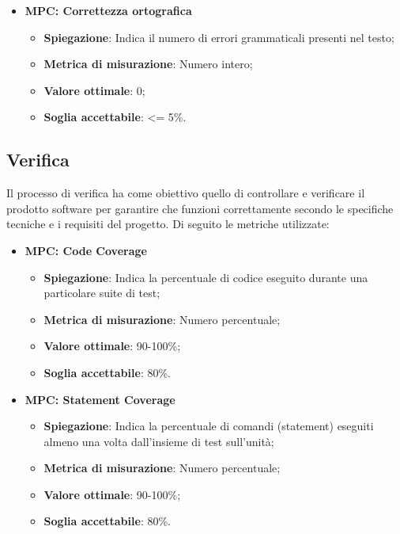 \begin{itemize}
    \item \textbf{MPC: Correttezza ortografica}
    \begin{itemize}
        \item \textbf{Spiegazione}: Indica il numero di errori grammaticali presenti nel testo;
        \item \textbf{Metrica di misurazione}: Numero intero;
        \item \textbf{Valore ottimale}: 0;
        \item \textbf{Soglia accettabile}: <= 5\%.
    \end{itemize}
\end{itemize}

\subsection{Verifica}
Il processo di verifica ha come obiettivo quello di controllare e verificare il prodotto software per garantire che funzioni correttamente secondo le specifiche tecniche e i requisiti del progetto. Di seguito le metriche utilizzate:

\begin{itemize}
    \item \textbf{MPC: Code Coverage}
    \begin{itemize}
        \item \textbf{Spiegazione}: Indica la percentuale di codice eseguito durante una particolare suite di test;
        \item \textbf{Metrica di misurazione}: Numero percentuale;
        \item \textbf{Valore ottimale}: 90-100\%;
        \item \textbf{Soglia accettabile}: 80\%.
    \end{itemize}
\end{itemize}

\begin{itemize}
    \item \textbf{MPC: Statement Coverage}
    \begin{itemize}
        \item \textbf{Spiegazione}: Indica la percentuale di comandi (statement) eseguiti almeno una volta dall'insieme di test sull'unità;
        \item \textbf{Metrica di misurazione}: Numero percentuale;
        \item \textbf{Valore ottimale}: 90-100\%;
        \item \textbf{Soglia accettabile}: 80\%.
    \end{itemize}
\end{itemize}

